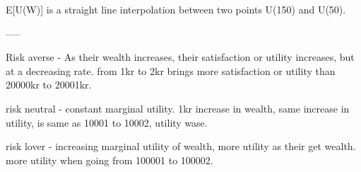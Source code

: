 E[U(W)] is a straight line interpolation between two points U(150) and U(50).







-----


Risk averse - As their wealth increases, their satisfaction or utility increases, but at a decreasing rate. from 1kr to 2kr brings more satisfaction or utility than 20000kr to 20001kr. 

risk neutral - constant marginal utility. 1kr increase in wealth, same increase in utility, is same as 10001 to 10002, utility wase.

risk lover - increasing marginal utility of wealth, more utility as their get wealth. more utility when going from 100001 to 100002. 

